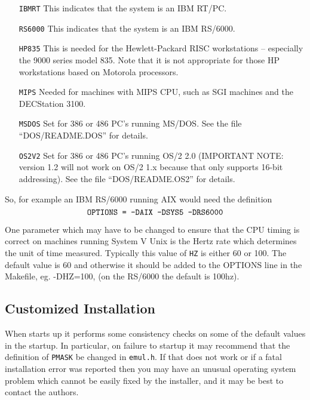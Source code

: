 \begin{itemize}
\begin{enumerate}
\item[{\tt IBMRT}] This indicates that the system is an IBM RT/PC.

\item[{\tt RS6000}] This indicates that the system is an IBM RS/6000.

\item[{\tt HP835}] This is needed for the Hewlett-Packard RISC workstations --
especially the 9000 series model 835. Note that it is not appropriate for 
those HP workstations based on Motorola processors.

\item[{\tt MIPS}] Needed for machines with MIPS CPU, such as SGI machines
and the DECStation 3100.

\chgbarbegin
\item[{\tt MSDOS}] Set for 386 or 486 PC's running MS/DOS.
See the file ``DOS/README.DOS'' for details.

\item[{\tt OS2V2}] Set for 386 or 486 PC's running OS/2 2.0 
(IMPORTANT NOTE: \CLPR{} version 1.2 will not
work on OS/2 1.x because that only supports 16-bit addressing).
See the file ``DOS/README.OS2'' for details.
\chgbarend
\end{enumerate}
So, for example an IBM RS/6000 running AIX would need the definition
\[\mbox{\tt OPTIONS = -DAIX -DSYS5 -DRS6000}\]
\end{itemize}

\chgbarbegin
One parameter which may have to be changed to ensure that the CPU timing
is correct on machines running System V Unix is the Hertz rate which
determines the unit of time measured.
Typically this value of {\tt HZ} is either 60 or 100.
The default value is 60 and otherwise it should be added to the
OPTIONS line in the Makefile, eg. -DHZ=100,
(on the RS/6000 the default is 100hz).
\chgbarend

\subsection{Customized Installation}


When \CLPR{} starts up it performs some consistency checks on some
of the default values in the startup.
In particular, on failure to startup it may recommend that
the definition of {\tt PMASK} be changed in {\tt emul.h}.
If that does not work or if a fatal installation error was reported
then you may have an unusual operating system problem which cannot
be easily fixed by the installer, and it may be best to 
contact the authors.

